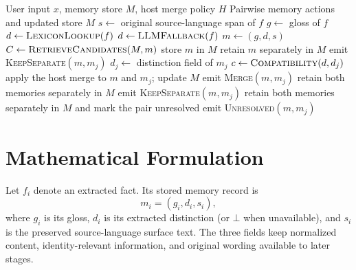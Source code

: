 \documentclass[conference]{IEEEtran}
\begin{document}
\begin{algorithm}[t]
\caption{DK-Mem Distinction-Aware Memory Consolidation}
\label{alg:dkmem-appendix}
\begin{algorithmic}[1]
\Require User input $x$, memory store $M$, host merge policy $H$
\Ensure Pairwise memory actions and updated store $M$
    \State $s \gets$ original source-language span of $f$
    \State $g \gets$ gloss of $f$
    \State $d \gets \Call{LexiconLookup}{f}$
        \State $d \gets \Call{LLMFallback}{f}$
    \EndIf
    \State $m \gets (g,d,s)$
    \State $C \gets \Call{RetrieveCandidates}{M,m}$
        \State store $m$ in $M$
    \Else
                \State retain $m$ separately in $M$
                \State emit \textsc{KeepSeparate}$(m,m_j)$
            \Else
                \State $d_j \gets$ distinction field of $m_j$
                \State $c \gets \Call{Compatibility}{d,d_j}$
                    \State apply the host merge to $m$ and $m_j$; update $M$
                    \State emit \textsc{Merge}$(m,m_j)$
                    \State retain both memories separately in $M$
                    \State emit \textsc{KeepSeparate}$(m,m_j)$
                \Else
                    \State retain both memories separately in $M$ and mark the pair unresolved
                    \State emit \textsc{Unresolved}$(m,m_j)$
                \EndIf
            \EndIf
        \EndFor
    \EndIf
\EndFor
\end{algorithmic}
\end{algorithm}
\FloatBarrier

\section{Mathematical Formulation}
\label{app:formulation}

Let $f_i$ denote an extracted fact. Its stored memory record is
\begin{equation}
    m_i = (g_i,d_i,s_i),
    \label{app:eq:memory}
\end{equation}
where $g_i$ is its gloss, $d_i$ is its extracted distinction (or $\bot$ when unavailable), and $s_i$ is the preserved source-language surface text. The three fields keep normalized content, identity-relevant information, and original wording available to later stages.
\end{document}
